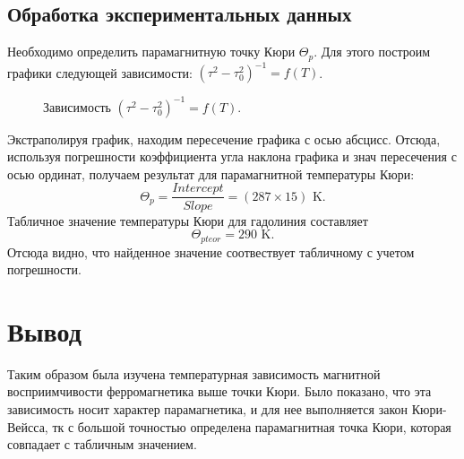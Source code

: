 \documentclass[a4paper, 14pt]{extarticle}%
\begin{document}
\subsection*{Обработка экспериментальных данных}
Необходимо определить парамагнитную точку Кюри $\Theta_p$. Для этого построим графики следующей зависимости: $(\tau^2 - \tau_0^2)^{-1} = f(T)$.
\begin{figure}[h!]
\caption{Зависимость $(\tau^2 - \tau_0^2)^{-1} = f(T)$.}
\end{figure}
Экстраполируя график, находим пересечение графика с осью абсцисс. Отсюда, используя погрешности коэффициента угла наклона графика и знач пересечения с осью ординат, получаем результат для парамагнитной температуры Кюри:
\begin{equation}
\Theta_p = \dfrac{Intercept}{Slope} = (287 \times 15) \text{ K.}
\end{equation}
Табличное значение температуры Кюри для гадолиния составляет
\begin{equation}
\Theta_{pteor} = 290 \text{ K.}
\end{equation}
Отсюда видно, что найденное значение соотвествует табличному с учетом погрешности.

\section*{ Вывод}
Таким образом была изучена температурная зависимость магнитной восприимчивости ферромагнетика выше точки Кюри. Было показано, что эта зависимость носит характер парамагнетика, и для нее выполняется закон Кюри-Вейсса, тк с большой точностью определена парамагнитная точка Кюри, которая совпадает с табличным значением.
\end{document}
